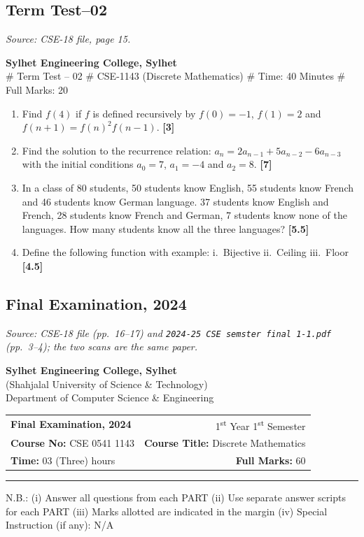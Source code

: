 \documentclass[11pt,a4paper]{article}
\makeatletter
\newcommand{\mk}[1]{\hfill\textbf{[#1]}}
\newcommand{\srcnote}[1]{{\footnotesize\itshape Source: #1}\par\smallskip}
\newenvironment{Ql}{\begin{enumerate}[leftmargin=2.5em,labelsep=0.4em,itemsep=5pt,topsep=2pt]}{\end{enumerate}}
\newcommand{\paperhead}[5]{%
\begin{center}
{\large\bfseries Sylhet Engineering College, Sylhet}\\
{\small (Shahjalal University of Science \& Technology)}\\
{\small Department of Computer Science \& Engineering}
\end{center}
\vspace{-2pt}
\noindent\begin{tabular*}{\linewidth}{@{}l@{\extracolsep{\fill}}r@{}}
\textbf{#1} & 1\textsuperscript{st} Year 1\textsuperscript{st} Semester\\
\textbf{Course No:} #2 & \textbf{Course Title:} #5\\
\textbf{Time:} #3 & \textbf{Full Marks:} #4
\end{tabular*}\par\smallskip\hrule\medskip}
\makeatother
\begin{document}
\subsection{Term Test--02}
\srcnote{CSE-18 file, page 15.}
\begin{center}
{\bfseries Sylhet Engineering College, Sylhet}\\
\# Term Test -- 02 \quad \# CSE-1143 (Discrete Mathematics) \quad \# Time: 40 Minutes \quad \# Full Marks: 20
\end{center}
\begin{Ql}
\item Find $f(4)$ if $f$ is defined recursively by $f(0)=-1$, $f(1)=2$ and $f(n+1)=f(n)^2f(n-1)$. \mk{3}
\item Find the solution to the recurrence relation: $a_n=2a_{n-1}+5a_{n-2}-6a_{n-3}$ with the initial conditions $a_0=7$, $a_1=-4$ and $a_2=8$. \mk{7}
\item In a class of 80 students, 50 students know English, 55 students know French and 46 students know German language. 37 students know English and French, 28 students know French and German, 7 students know none of the languages. How many students know all the three languages? \mk{5.5}
\item Define the following function with example: i.\ Bijective \quad ii.\ Ceiling \quad iii.\ Floor \mk{4.5}
\end{Ql}

\clearpage
\subsection{Final Examination, 2024}
\srcnote{CSE-18 file (pp.~16--17) and \texttt{2024-25 CSE semster final 1-1.pdf} (pp.~3--4); the two scans are the same paper.}
\paperhead{Final Examination, 2024}{CSE 0541 1143}{03 (Three) hours}{60}{Discrete Mathematics}
{\small N.B.: (i) Answer all questions from each PART \quad (ii) Use separate answer scripts for each PART \quad (iii) Marks allotted are indicated in the margin \quad (iv) Special Instruction (if any): N/A}
\end{document}
